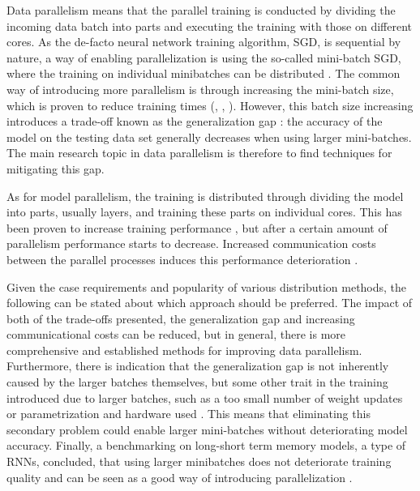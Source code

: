 Data parallelism means that the parallel training is conducted by dividing the incoming data batch into parts and executing the training with those on different cores. As the de-facto neural network training algorithm, SGD, is sequential by nature, a way of enabling parallelization is using the so-called mini-batch SGD, where the training on individual minibatches can be distributed \cite{DBLP:conf/icml/LeNCLPN11}. The common way of introducing more parallelism is through increasing the mini-batch size, which is proven to reduce training times (\cite{shallue_measuring_2019}, \cite{goyal_accurate_2018}, \cite{smith_dont_2018}). However, this batch size increasing introduces a trade-off known as the generalization gap \cite{hoffer_train_2018}: the accuracy of the model on the testing data set generally decreases when using larger mini-batches. The main research topic in data parallelism is therefore to find techniques for mitigating this gap.

As for model parallelism, the training is distributed through dividing the model into parts, usually layers, and training these parts on individual cores. This has been proven to increase training performance \cite{ericson_performance_2017}, but after a certain amount of parallelism performance starts to decrease. Increased communication costs between the parallel processes induces this performance deterioration \cite{ben-nunDemystifyingParallelDistributed2019} \cite{ericson_performance_2017}.

Given the case requirements and popularity of various distribution methods, the following can be stated about which approach should be preferred. The impact of both of the trade-offs presented, the generalization gap and increasing communicational costs can be reduced, but in general, there is more comprehensive and established methods for improving data parallelism. Furthermore, there is indication that the generalization gap is not inherently caused by the larger batches themselves, but some other trait in the training introduced due to larger batches, such as a too small number of weight updates \cite{hoffer_train_2018} or parametrization and hardware used \cite{shallue_measuring_2019}. This means that eliminating this secondary problem could enable larger mini-batches without deteriorating model accuracy. Finally, a benchmarking on long-short term memory models, a type of RNNs, concluded, that using larger minibatches does not deteriorate training quality and can be seen as a good way of introducing parallelization \cite{breuel_benchmarking_2015}.

